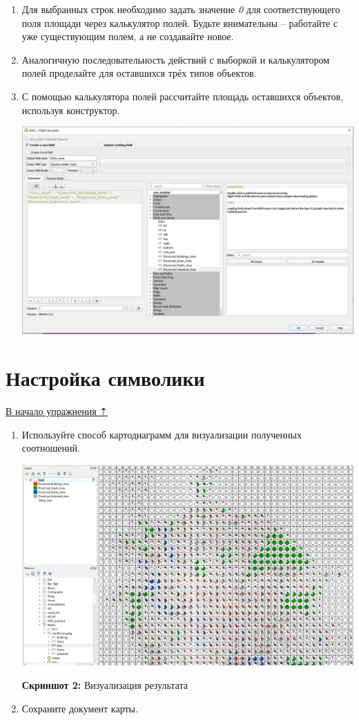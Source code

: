 \documentclass[
  12pt,
]{book}
\begin{document}
\begin{enumerate}
\def\labelenumi{\arabic{enumi}.}
\setcounter{enumi}{3}
\item
  Для выбранных строк необходимо задать значение \emph{0} для соответствующего поля площади через калькулятор полей. Будьте внимательны -- работайте с уже существующим полем, а не создавайте новое.
\item
  Аналогичную последовательность действий с выборкой и калькулятором полей проделайте для оставшихся трёх типов объектов.
\item
  С помощью калькулятора полей рассчитайте площадь оставшихся объектов, используя конструктор.

  \includegraphics{images/Ex06_SpatRelations/Field_Calculator.png}
\end{enumerate}

\hypertarget{spatrelations-symbology}{%
\section{Настройка символики}\label{spatrelations-symbology}}

\protect\hyperlink{spatrelations}{В начало упражнения ⇡}

\begin{enumerate}
\def\labelenumi{\arabic{enumi}.}
\item
  Используйте способ картодиаграмм для визуализации полученных соотношений.

  \includegraphics{images/Ex06_SpatRelations/Result.png}

  \textbf{Скриншот 2:} Визуализация результата
\item
  Сохраните документ карты.
\end{enumerate}
\end{document}

